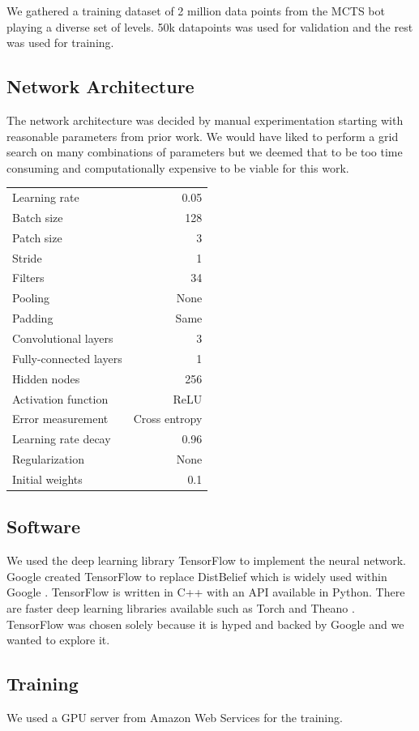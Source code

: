 \documentclass{kththesis}
\begin{document}
We gathered a training dataset of 2 million data points from the MCTS bot playing a diverse set of levels. 50k datapoints was used for validation and the rest was used for training.

\subsection{Network Architecture}
The network architecture was decided by manual experimentation starting with reasonable parameters from prior work. We would have liked to perform a grid search on many combinations of parameters but we deemed that to be too time consuming and computationally expensive to be viable for this work. 

\begin{tabular}{ l | r }
Learning rate & 0.05 \\
Batch size & 128 \\
Patch size & 3 \\
Stride & 1 \\
Filters & 34 \\
Pooling & None \\
Padding & Same \\
Convolutional layers & 3 \\
Fully-connected layers & 1 \\
Hidden nodes & 256 \\
Activation function & ReLU \\
Error measurement & Cross entropy \\
Learning rate decay & 0.96 \\
Regularization & None \\
Initial weights & 0.1 \\
\end{tabular}

\subsection{Software}
We used the deep learning library TensorFlow to implement the neural network. Google created TensorFlow to replace DistBelief which is widely used within Google \cite{abadi2016tensorflow}. TensorFlow is written in C++ with an API available in Python. There are faster deep learning libraries available such as Torch and Theano \cite{bahrampour2015comparative}. TensorFlow was chosen solely because it is hyped and backed by Google and we wanted to explore it.

\subsection{Training}
We used a GPU server from Amazon Web Services for the training.
\end{document}

